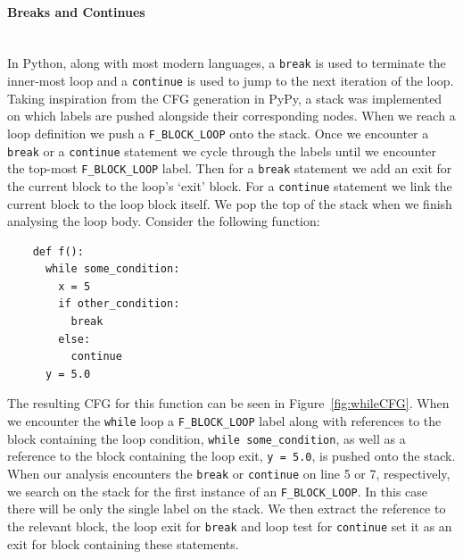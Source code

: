 \documentclass[12pt, titlepage]{article}
\begin{document}
\paragraph*{Breaks and Continues} \mbox{} \\
In Python, along with most modern languages, a \texttt{break} is used to terminate the inner-most loop and a \texttt{continue} is used to jump to the next iteration of the loop. Taking inspiration from the CFG generation in PyPy, a stack was implemented on which labels are pushed alongside their corresponding nodes. When we reach a loop definition we push a \texttt{F\_BLOCK\_LOOP} onto the stack. Once we encounter a \texttt{break} or a \texttt{continue} statement we cycle through the labels until we encounter the top-most \texttt{F\_BLOCK\_LOOP} label. Then for a \texttt{break} statement we add an exit for the current block to the loop's `exit' block. For a \texttt{continue} statement we link the current block to the loop block itself. We pop the top of the stack when we finish analysing the loop body. Consider the following function:
\begin{lstlisting}
    def f():
      while some_condition:
        x = 5
        if other_condition:
          break
        else:
          continue
      y = 5.0
\end{lstlisting}
The resulting CFG for this function can be seen in Figure~\ref{fig:whileCFG}. When we encounter the \texttt{while} loop a \texttt{F\_BLOCK\_LOOP} label along with references to the block containing the loop condition, \texttt{while some\_condition}, as well as a reference to the block containing the loop exit, \texttt{y = 5.0}, is pushed onto the stack. When our analysis encounters the \texttt{break} or \texttt{continue} on line 5 or 7, respectively, we search on the stack for the first instance of an \texttt{F\_BLOCK\_LOOP}. In this case there will be only the single label on the stack. We then extract the reference to the relevant block, the loop exit for \texttt{break} and loop test for \texttt{continue} set it as an exit for block containing these statements.
\end{document}
